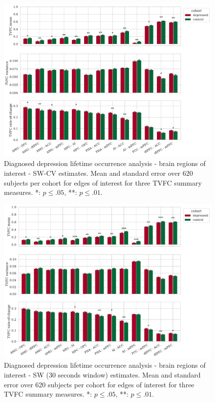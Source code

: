 \begin{figure}[h]
    \centering
    \includegraphics[width=\textwidth]{fig/ukbiobank/TVFC_predictions_summaries/diagnosed_lifetime_occurrence/cohort_comparison/ROI/correlation_all_TVFC_summary_measures_SW_cross_validated_edges_of_interest}
    \caption{
        Diagnosed depression lifetime occurrence analysis - brain regions of interest - SW-CV estimates.
        Mean and standard error over 620 subjects per cohort for edges of interest for three TVFC summary measures.
        *: $p \leq .05$, **: $p \leq .01$.
    }\label{fig:ukb-results-dlo-roi-cohort-comparison-edges-of-interest-sw-cv}
\end{figure}


\begin{figure}[h]
    \centering
    \includegraphics[width=\textwidth]{fig/ukbiobank/TVFC_predictions_summaries/diagnosed_lifetime_occurrence/cohort_comparison/ROI/correlation_all_TVFC_summary_measures_SW_30_edges_of_interest}
    \caption{
        Diagnosed depression lifetime occurrence analysis - brain regions of interest - SW (30 seconds window) estimates.
        Mean and standard error over 620 subjects per cohort for edges of interest for three TVFC summary measures.
        *: $p \leq .05$, **: $p \leq .01$.
    }\label{fig:ukb-results-dlo-roi-cohort-comparison-edges-of-interest-sw-30}
\end{figure}


